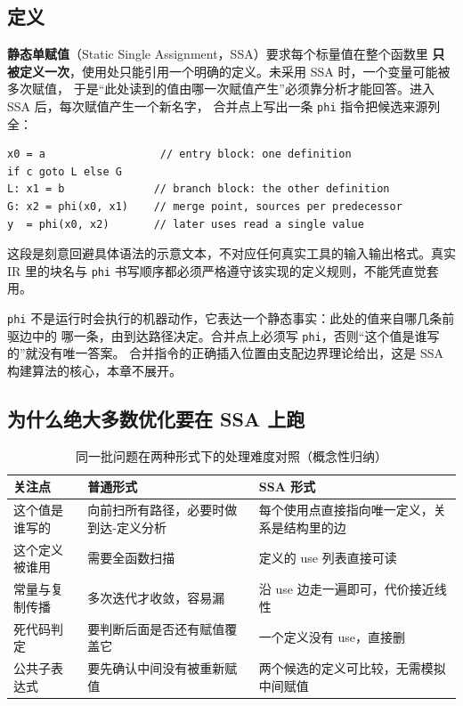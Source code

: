 \documentclass[12pt,a4paper,fontset=fandol]{ctexbook}
\newcommand{\Tp}[1]{\texttt{#1}}
\begin{document}
\subsection{定义}\label{sec:cl04-ssa-def}

\textbf{静态单赋值}（Static Single Assignment，SSA）要求每个标量值在整个函数里
\textbf{只被定义一次}，使用处只能引用一个明确的定义。未采用 SSA 时，一个变量可能被多次赋值，
于是“此处读到的值由哪一次赋值产生”必须靠分析才能回答。进入 SSA 后，每次赋值产生一个新名字，
合并点上写出一条 \Tp{phi} 指令把候选来源列全：

\begin{lstlisting}[style=outstyle]
x0 = a                  // entry block: one definition
if c goto L else G
L: x1 = b              // branch block: the other definition
G: x2 = phi(x0, x1)    // merge point, sources per predecessor
y  = phi(x0, x2)       // later uses read a single value
\end{lstlisting}

这段是刻意回避具体语法的示意文本，不对应任何真实工具的输入输出格式。真实 IR 里的块名与
\Tp{phi} 书写顺序都必须严格遵守该实现的定义规则，不能凭直觉套用。

\Tp{phi} 不是运行时会执行的机器动作，它表达一个静态事实：此处的值来自哪几条前驱边中的
哪一条，由到达路径决定。合并点上必须写 \Tp{phi}，否则“这个值是谁写的”就没有唯一答案。
合并指令的正确插入位置由支配边界理论给出，这是 SSA 构建算法的核心，本章不展开。

\subsection{为什么绝大多数优化要在 SSA 上跑}\label{sec:cl04-ssa-why}

\begin{table}[htbp]
  \centering
  \begin{tabular}{>{\raggedright\arraybackslash}p{} >{\raggedright\arraybackslash}p{} >{\raggedright\arraybackslash}p{}}
    \hline
    \textbf{关注点} & \textbf{普通形式} & \textbf{SSA 形式} \\
    \hline
    这个值是谁写的 & 向前扫所有路径，必要时做到达-定义分析 & 每个使用点直接指向唯一定义，关系是结构里的边 \\
    \hline
    这个定义被谁用 & 需要全函数扫描 & 定义的 use 列表直接可读 \\
    \hline
    常量与复制传播 & 多次迭代才收敛，容易漏 & 沿 use 边走一遍即可，代价接近线性 \\
    \hline
    死代码判定 & 要判断后面是否还有赋值覆盖它 & 一个定义没有 use，直接删 \\
    \hline
    公共子表达式 & 要先确认中间没有被重新赋值 & 两个候选的定义可比较，无需模拟中间赋值 \\
    \hline
  \end{tabular}
  \caption{同一批问题在两种形式下的处理难度对照（概念性归纳）}
  \label{tab:cl04-ssa-vs-plain}
\end{table}
\end{document}
